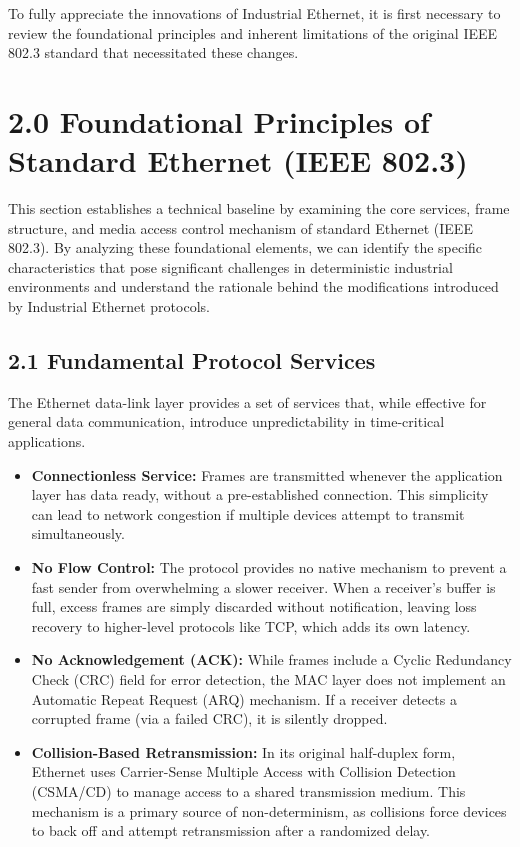 \documentclass[a4paper, 12pt]{book} %
\begin{document}
To fully appreciate the innovations of Industrial Ethernet, it is first
necessary to review the foundational principles and inherent limitations
of the original IEEE 802.3 standard that necessitated these changes.

\section{2.0 Foundational Principles of Standard Ethernet (IEEE
802.3)}\label{foundational-principles-of-standard-ethernet-ieee-802.3}

This section establishes a technical baseline by examining the core
services, frame structure, and media access control mechanism of
standard Ethernet (IEEE 802.3). By analyzing these foundational
elements, we can identify the specific characteristics that pose
significant challenges in deterministic industrial environments and
understand the rationale behind the modifications introduced by
Industrial Ethernet protocols.

\subsection{2.1 Fundamental Protocol
Services}\label{fundamental-protocol-services}

The Ethernet data-link layer provides a set of services that, while
effective for general data communication, introduce unpredictability in
time-critical applications.

\begin{itemize}
\tightlist
\item
  \textbf{Connectionless Service:} Frames are transmitted whenever the
  application layer has data ready, without a pre-established
  connection. This simplicity can lead to network congestion if multiple
  devices attempt to transmit simultaneously.
\item
  \textbf{No Flow Control:} The protocol provides no native mechanism to
  prevent a fast sender from overwhelming a slower receiver. When a
  receiver's buffer is full, excess frames are simply discarded without
  notification, leaving loss recovery to higher-level protocols like
  TCP, which adds its own latency.
\item
  \textbf{No Acknowledgement (ACK):} While frames include a Cyclic
  Redundancy Check (CRC) field for error detection, the MAC layer does
  not implement an Automatic Repeat Request (ARQ) mechanism. If a
  receiver detects a corrupted frame (via a failed CRC), it is silently
  dropped.
\item
  \textbf{Collision-Based Retransmission:} In its original half-duplex
  form, Ethernet uses Carrier-Sense Multiple Access with Collision
  Detection (CSMA/CD) to manage access to a shared transmission medium.
  This mechanism is a primary source of non-determinism, as collisions
  force devices to back off and attempt retransmission after a
  randomized delay.
\end{itemize}
\end{document}
